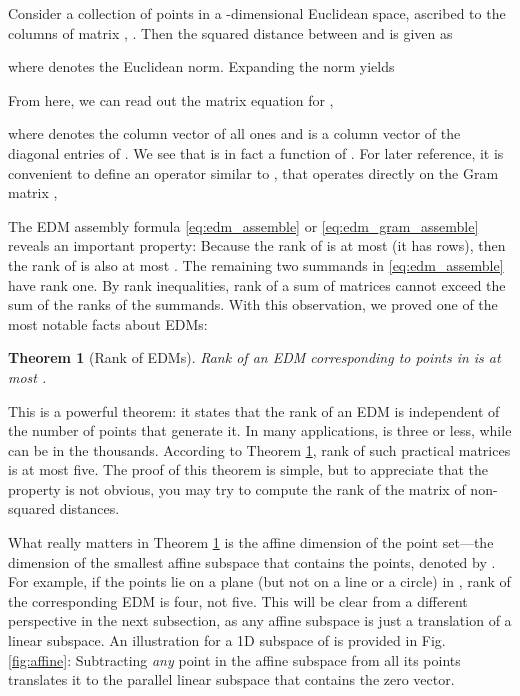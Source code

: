 \documentclass[10pt,double]{IEEEtran}
\newtheorem{thm}{Theorem}
\begin{document}
Consider a collection of  points in a -dimensional Euclidean space,
ascribed to the columns of matrix , . Then the squared distance between  and  is given as

where  denotes the Euclidean norm. Expanding the norm
yields

From here, we can read out the matrix equation for ,

where  denotes the column vector of all ones and  is a
column vector of the diagonal entries of . We see that  is in
fact a function of . For later reference, it is convenient to
define an operator  similar to , that operates
directly on the Gram matrix ,


The EDM assembly formula \eqref{eq:edm_assemble} or
\eqref{eq:edm_gram_assemble} reveals an important property: Because the rank
of  is at most  (it has  rows), then the rank of  is
also at most . The remaining two summands in
\eqref{eq:edm_assemble} have rank one. By rank inequalities, rank of a sum of
matrices cannot exceed the sum of the ranks of the summands. With this
observation, we proved one of the most notable facts about EDMs:

\begin{thm}[Rank of EDMs]
\label{thm:edm_rank}
Rank of an EDM corresponding to points in  is at most .
\end{thm}

This is a powerful theorem: it states that the rank of an EDM is independent
of the number of points that generate it. In many applications,  is three
or less, while  can be in the thousands. According to Theorem
\ref{thm:edm_rank}, rank of such practical matrices is at most five. The proof
of this theorem is simple, but to appreciate that the property is not obvious,
you may try to compute the rank of the matrix of non-squared distances.

What really matters in Theorem \ref{thm:edm_rank} is the affine dimension of
the point set---the dimension of the smallest affine subspace that contains
the points, denoted by . For example, if the points lie on a
plane (but not on a line or a circle) in , rank of the corresponding EDM
is four, not five. This will be clear from a different perspective in the next
subsection, as any affine subspace is just a translation of a linear subspace.
An illustration for a 1D subspace of  is provided in Fig.
\ref{fig:affine}: Subtracting \emph{any} point in the affine subspace from all
its points translates it to the parallel linear subspace that contains the
zero vector.
\end{document}
